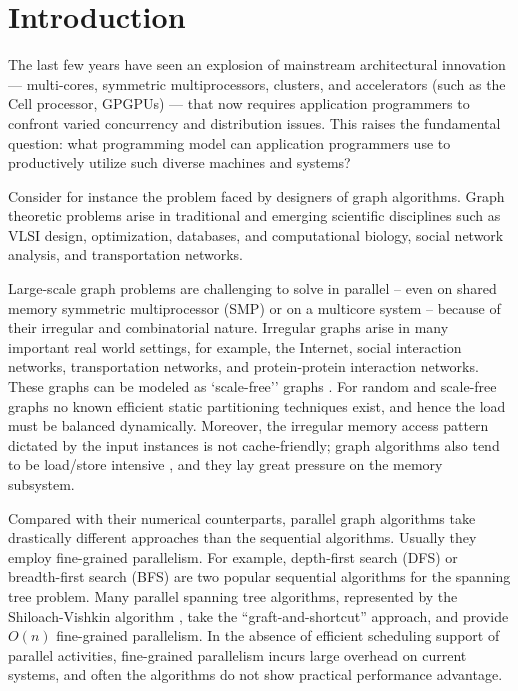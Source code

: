 
\section{Introduction}
\label{s:intr}

The last few years have seen an explosion of mainstream architectural
innovation --- multi-cores, symmetric multiprocessors, clusters, and
accelerators (such as the Cell processor, GPGPUs) --- that now
requires application programmers to confront varied concurrency and
distribution issues. This raises the fundamental question: what
programming model can application programmers use to productively utilize
such diverse machines and systems?

Consider for instance the problem faced by designers of graph
algorithms.  Graph theoretic problems arise in traditional and
emerging scientific disciplines such as VLSI design, optimization,
databases, and computational biology, social network analysis, and
transportation networks.

Large-scale graph problems are challenging to solve in parallel --
even on shared memory symmetric multiprocessor (SMP) or on a multicore
system -- because of their irregular and combinatorial nature.
Irregular graphs arise in many important real world settings, for
example, the Internet, social interaction networks, transportation
networks, and protein-protein interaction networks.  These graphs can
be modeled as `scale-free'' graphs \cite{CZF04}. For random and
scale-free graphs no known efficient static partitioning techniques
exist, and hence the load must be balanced dynamically.  Moreover, the
irregular memory access pattern dictated by the input instances is not
cache-friendly; graph algorithms also tend to be load/store intensive
\cite{G06}, and they lay great pressure on the memory subsystem.

Compared with their numerical counterparts, parallel graph algorithms
take drastically different approaches than the sequential algorithms.
Usually they employ fine-grained parallelism. For example, depth-first
search (DFS) or breadth-first search (BFS) are two popular sequential
algorithms for the spanning tree problem. Many parallel spanning tree
algorithms, represented by the Shiloach-Vishkin algorithm \cite{SV82},
take the ``graft-and-shortcut'' approach, and provide $O(n)$
fine-grained parallelism. In the absence of efficient scheduling
support of parallel activities, fine-grained parallelism incurs large
overhead on current systems, and often the algorithms do not show
practical performance advantage.


